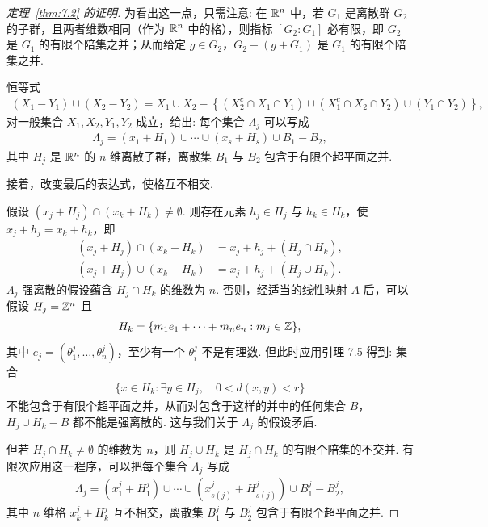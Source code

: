 \begin{proof}[定理~\ref{thm:7.2} 的证明]
为看出这一点，只需注意: 在 $\mathbb{R}^n$ 中，若 $G_1$ 是离散群 $G_2$ 的子群，且两者维数相同（作为 $\mathbb{R}^n$ 中的格），则指标 $[G_2 : G_1]$ 必有限，即 $G_2$ 是 $G_1$ 的有限个陪集之并；从而给定 $g \in G_2$，$G_2 - (g + G_1)$ 是 $G_1$ 的有限个陪集之并.

恒等式
\begin{align*}
  (X_{1}-Y_{1})\cup(X_{2}-Y_{2})
  =X_{1}\cup X_{2}-\left\{\left(X_{2}^{c}\cap X_{1}\cap Y_{1}\right)
  \cup\left(X_{1}^{c}\cap X_{2}\cap Y_{2}\right)
  \cup\left(Y_{1}\cap Y_{2}\right)\right\},
\end{align*}
对一般集合 $X_1, X_2, Y_1, Y_2$ 成立，给出: 每个集合 $\Lambda_j$ 可以写成
\begin{align*}
  \Lambda_{j}=\left(x_{1}+H_{1}\right)\cup\cdots\cup\left(x_{s}+H_{s}\right)\cup B_{1}-B_{2},
\end{align*}
其中 $H_j$ 是 $\mathbb{R}^n$ 的 $n$ 维离散子群，离散集 $B_1$ 与 $B_2$ 包含于有限个超平面之并.

接着，改变最后的表达式，使格互不相交.

假设 $(x_j + H_j) \cap (x_k + H_k) \neq \emptyset$. 则存在元素 $h_j \in H_j$ 与 $h_k \in H_k$，使 $x_j + h_j = x_k + h_k$，即
\begin{align*}
  \left(x_{j}+H_{j}\right)\cap\left(x_{k}+H_{k}\right)&=x_{j}+h_{j}+\left(H_{j}\cap H_{k}\right),\\
  \left(x_{j}+H_{j}\right)\cup\left(x_{k}+H_{k}\right)&=x_{j}+h_{j}+\left(H_{j}\cup H_{k}\right).
\end{align*}
$\Lambda_j$ 强离散的假设蕴含 $H_j \cap H_k$ 的维数为 $n$. 否则，经适当的线性映射 $A$ 后，可以假设 $H_j = \mathbb{Z}^n$ 且
\begin{align*}
  H_{k}=\{m_{1}e_{1}+\cdots+m_{n}e_{n}:m_{j}\in\mathbb{Z}\},
\end{align*}
其中 $e_j = (\theta_1^j, \ldots, \theta_n^j)$，至少有一个 $\theta_i^j$ 不是有理数. 但此时应用引理 7.5 得到: 集合
\begin{align*}
  \{x\in H_{k}:\exists y\in H_{j},\quad 0<d(x,y)<r\}
\end{align*}
不能包含于有限个超平面之并，从而对包含于这样的并中的任何集合 $B$，$H_j \cup H_k - B$ 都不能是强离散的. 这与我们关于 $\Lambda_j$ 的假设矛盾.

但若 $H_j \cap H_k \neq \emptyset$ 的维数为 $n$，则 $H_j \cup H_k$ 是 $H_j \cap H_k$ 的有限个陪集的不交并. 有限次应用这一程序，可以把每个集合 $\Lambda_j$ 写成
\begin{align*}
  \Lambda_{j}=(x_{1}^{j}+H_{1}^{j})\cup\cdots\cup(x_{s(j)}^{j}+H_{s(j)}^{j})\cup B_{1}^{j}-B_{2}^{j},
\end{align*}
其中 $n$ 维格 $x_k^j + H_k^j$ 互不相交，离散集 $B_1^j$ 与 $B_2^j$ 包含于有限个超平面之并.


\end{proof}
